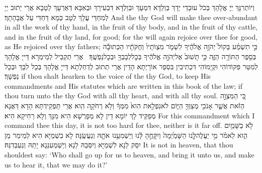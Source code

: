 {וְיוֹתְרִנָּךְ יְיָ אֱלָהָךְ בְּכֹל עוּבָדֵי יְדָךְ בְּוַלְדָּא דִּמְעָךְ וּבְוַלְדָּא דִּבְעִירָךְ וּבְאִבָּא דְּאַרְעָךְ לְטָבָא אֲרֵי יְתוּב יְיָ לְמִחְדֵּי עֲלָךְ לְטָב כְּמָא דַּחְדִּי עַל אֲבָהָתָךְ׃}
{And the \lord\space thy God will make thee over-abundant in all the work of thy hand, in the fruit of thy body, and in the fruit of thy cattle, and in the fruit of thy land, for good; for the \lord\space will again rejoice over thee for good, as He rejoiced over thy fathers;}{}
{כִּ֣י תִשְׁמַ֗ע בְּקוֹל֙ יְהֹוָ֣ה אֱלֹהֶ֔יךָ לִשְׁמֹ֤ר מִצְוֺתָיו֙ וְחֻקֹּתָ֔יו הַכְּתוּבָ֕ה בְּסֵ֥פֶר הַתּוֹרָ֖ה הַזֶּ֑ה כִּ֤י תָשׁוּב֙ אֶל\maqqaf יְהֹוָ֣ה אֱלֹהֶ֔יךָ בְּכׇל\maqqaf לְבָבְךָ֖ וּבְכׇל\maqqaf נַפְשֶֽׁךָ׃ \setuma }
{אֲרֵי תְקַבֵּיל לְמֵימְרָא דַּייָ אֱלָהָךְ לְמִטַּר פִּקּוֹדוֹהִי וּקְיָמוֹהִי דִּכְתִיבִין בִּסְפַר אוֹרָיְתָא הָדֵין אֲרֵי תְתוּב לְדַחְלְתָא דַּייָ אֱלָהָךְ בְּכָל לִבָּךְ וּבְכָל נַפְשָׁךְ׃}
{if thou shalt hearken to the voice of the \lord\space thy God, to keep His commandments and His statutes which are written in this book of the law; if thou turn unto the \lord\space thy God with all thy heart, and with all thy soul.}{}
{כִּ֚י הַמִּצְוָ֣ה הַזֹּ֔את אֲשֶׁ֛ר אָנֹכִ֥י מְצַוְּךָ֖ הַיּ֑וֹם לֹא\maqqaf נִפְלֵ֥את הִוא֙ מִמְּךָ֔ וְלֹ֥א רְחֹקָ֖ה הִֽוא׃}
{אֲרֵי תַּפְקֵידְתָּא הָדָא דַּאֲנָא מְפַקֵּיד לָךְ יוֹמָא דֵין לָא מְפָרְשָׁא הִיא מִנָּךְ וְלָא רַחִיקָא הִיא׃}
{For this commandment which I command thee this day, it is not too hard for thee, neither is it far off.}{}
{לֹ֥א בַשָּׁמַ֖יִם הִ֑וא לֵאמֹ֗ר מִ֣י יַעֲלֶה\maqqaf לָּ֤נוּ הַשָּׁמַ֙יְמָה֙ וְיִקָּחֶ֣הָ לָּ֔נוּ וְיַשְׁמִעֵ֥נוּ אֹתָ֖הּ וְנַעֲשֶֽׂנָּה׃}
{לָא בִשְׁמַיָּא הִיא לְמֵימַר מַן יִסַּק לַנָא לִשְׁמַיָּא וְיִסְּבַהּ לַנָא וְיַשְׁמְעִנַּנָא יָתַהּ וְנַעְבְּדִנַּהּ׃}
{It is not in heaven, that thou shouldest say: ‘Who shall go up for us to heaven, and bring it unto us, and make us to hear it, that we may do it?’}{}
